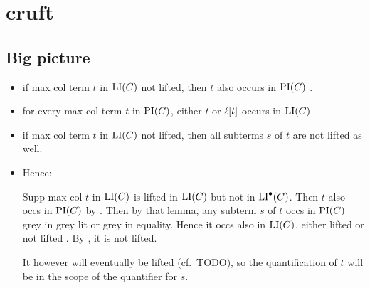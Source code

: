 \documentclass[,%
	draft=false,%
	numbers=noendperiod
	12pt,
	a4paper,
	oneside,%
	openany,
]{memoir}
\begin{document}
%

\section{cruft}

\subsection{Big picture}

\begin{itemize}
	\item if max col term $t$ in $\operatorname{LI}(C)$ not lifted, then $t$ also occurs in $\operatorname{PI}(C)$ .
	\item for every max col term $t$ in $\operatorname{PI}(C)$, either $t$ or $\ell[t]$ occurs in $\operatorname{LI}(C)$
	\item if max col term $t$ in $\operatorname{LI}(C)$ not lifted, then all subterms $s$ of $t$ are not lifted as well.
	\item Hence: 

		Supp max col $t$ in $\operatorname{LI}(C)$ is lifted in $\operatorname{LI}(C)$ but not in $\operatorname{LI}^\bullet(C)$. \newline
		Then $t$ also occs in $\operatorname{PI}(C)$ by . \newline
		Then by that lemma, any subterm $s$ of $t$ occs in $\operatorname{PI}(C)$ grey in grey lit or grey in equality.
		Hence it occs also in $\operatorname{LI}(C)$, either lifted or not lifted  .\newline
		By , it is not lifted.

		It however will eventually be lifted (cf.\ TODO), so the quantification of $t$ will be in the scope of the quantifier for $s$.
\end{itemize}
\end{document}
